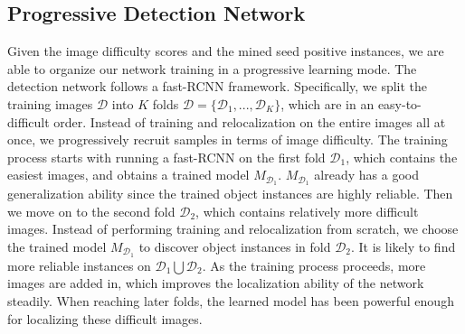 \documentclass[10pt,twocolumn,letterpaper]{article}
\begin{document}
\subsection{Progressive Detection Network}
Given the image difficulty scores and the mined seed positive instances, we are able to organize our network training in a progressive learning mode. The  detection network follows a fast-RCNN \cite{girshick2015fast} framework. Specifically, we split the training images $\mathcal{D}$ into $K$ folds $\mathcal{D}=\{\mathcal{D}_1,...,\mathcal{D}_K\}$, which are in an easy-to-difficult order. Instead of training and relocalization on the entire images all at once, we progressively recruit samples in terms of image difficulty. The training process starts with running a fast-RCNN on the first fold $\mathcal{D}_1$, which contains the easiest images, and obtains a trained model $M_{\mathcal{D}_1}$. $M_{\mathcal{D}_1}$ already has a good generalization ability since the trained object instances are highly reliable. Then we move on to the second fold $\mathcal{D}_2$, which contains relatively more difficult images. Instead of performing training and relocalization from scratch, we choose the trained model $M_{\mathcal{D}_1}$ to discover object instances in fold $\mathcal{D}_2$. It is likely to find more reliable instances on $\mathcal{D}_1 \bigcup \mathcal{D}_2$. As the training process proceeds, more images are added in, which improves the localization ability of the network steadily. When reaching later folds, the learned model has been powerful enough for localizing these difficult images.
\end{document}
